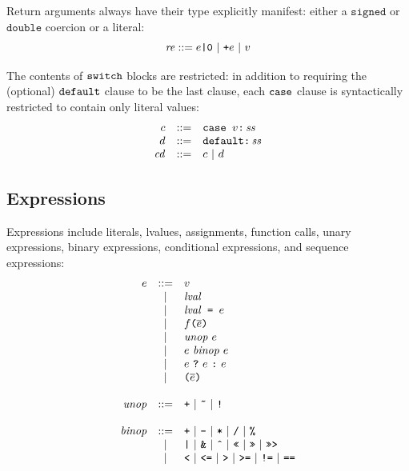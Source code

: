 \documentclass{article}
\newcommand{\ternary}[3]{{#1}\ \mathjs{?}\ {#2}\ \mathjs{:}\ {#3}}
\newcommand{\funcall}[2]{{#1}\mathjs{(}{#2}\mathjs{)}}
\newcommand{\paren}[1]{\mathjs{(}{#1}\mathjs{)}}
\newcommand{\seq}[1]{\overline{{#1}}}
\newcommand{\mathjs}[1]{\mbox{\texttt{{#1}}}}
\newcommand{\signed}{\mathtt{signed}}
\newcommand{\double}{\mathtt{double}}
\newcommand{\todouble}[1]{\mathjs{+}{#1}}
\begin{document}
Return arguments always have their type explicitly manifest: either a
$\signed$ or $\double$ coercion or a literal:
\[
\mathit{re} ::= e\mathjs{|0} ~|~ \todouble{e} ~|~ v
\]

The contents of $\mathjs{switch}$ blocks are restricted: in addition
to requiring the (optional) $\mathjs{default}$ clause to be the last
clause, each $\mathjs{case}$ clause is syntactically restricted to
contain only literal values:
\[
\begin{array}{rcl}
c & ::= & \mathjs{case }v\mathjs{:}\,\mathit{ss} \\
d & ::= & \mathjs{default:}\,\mathit{ss} \\
\mathit{cd} & ::= & c ~|~ d \\
\end{array}
\]

\subsection{Expressions}

Expressions include literals, lvalues, assignments, function calls,
unary expressions, binary expressions, conditional expressions, and
sequence expressions:
\[
\begin{array}{rcl}
e & ::= & v \\
  &  |  & \mathit{lval} \\
  &  |  & \mathit{lval}\mathjs{ = }e \\
  &  |  & \funcall{f}{\seq{e}} \\
  &  |  & \mathit{unop}\ e \\
  &  |  & e\ \mathit{binop}\ e \\
  &  |  & \ternary{e}{e}{e} \\
  &  |  & \paren{\seq{e}} \\
\\
\mathit{unop} & ::= & \mathjs{+} ~|~ \mathjs{\~{}} ~|~ \mathjs{!} \\
\\
\mathit{binop} & ::= & \mathjs{+} ~|~ \mathjs{-} ~|~ \mathjs{*} ~|~ \mathjs{/} ~|~ \mathjs{\%} \\
               &  |  & \mathjs{|} ~|~ \mathjs{\&} ~|~ \mathjs{\^{}} ~|~ \mathjs{<<} ~|~ \mathjs{>>} ~|~ \mathjs{>>>} \\
               &  |  & \mathjs{<} ~|~ \mathjs{<=} ~|~ \mathjs{>} ~|~ \mathjs{>=} ~|~ \mathjs{!=} ~|~ \mathjs{==} \\
\end{array}
\]
\end{document}
